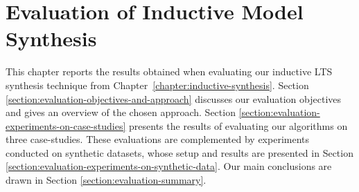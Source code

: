 \chapter{Evaluation of Inductive Model Synthesis\label{chapter:evaluation}}

This chapter reports the results obtained when evaluating our inductive LTS synthesis technique from Chapter~\ref{chapter:inductive-synthesis}. Section \ref{section:evaluation-objectives-and-approach} discusses our evaluation objectives and gives an overview of the chosen approach. Section \ref{section:evaluation-experiments-on-case-studies} presents the results of evaluating our algorithms on three case-studies. These evaluations are complemented by experiments conducted on synthetic datasets, whose setup and results are presented in Section \ref{section:evaluation-experiments-on-synthetic-data}. Our main conclusions are drawn in Section \ref{section:evaluation-summary}.





